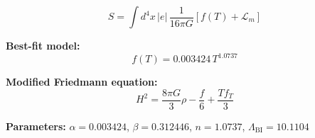 
\begin{equation}
  S = \int d^4x \, |e| \, \frac{1}{16\pi G} \left[ f(T) + \mathcal{L}_m \right]
\end{equation}

\textbf{Best-fit model:}
\begin{equation}
  f(T) = 0.003424 \, T^{1.0737}
\end{equation}

\textbf{Modified Friedmann equation:}
\begin{equation}
  H^2 = \frac{8\pi G}{3} \rho - \frac{f}{6} + \frac{T f_T}{3}
\end{equation}

\textbf{Parameters:}
$\alpha = 0.003424$, \quad
$\beta = 0.312446$, \quad
$n = 1.0737$, \quad
$\Lambda_{\text{BI}} = 10.1104$
